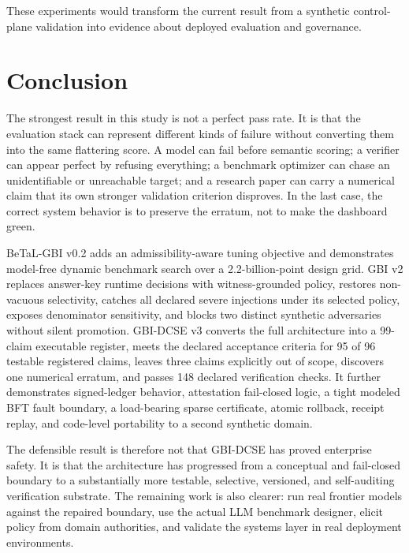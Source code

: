 \documentclass[11pt]{article}
\begin{document}
These experiments would transform the current result from a synthetic control-plane validation into evidence about deployed evaluation and governance.

\section{Conclusion}

The strongest result in this study is not a perfect pass rate. It is that the evaluation stack can represent different kinds of failure without converting them into the same flattering score. A model can fail before semantic scoring; a verifier can appear perfect by refusing everything; a benchmark optimizer can chase an unidentifiable or unreachable target; and a research paper can carry a numerical claim that its own stronger validation criterion disproves. In the last case, the correct system behavior is to preserve the erratum, not to make the dashboard green.

BeTaL-GBI v0.2 adds an admissibility-aware tuning objective and demonstrates model-free dynamic benchmark search over a 2.2-billion-point design grid. GBI v2 replaces answer-key runtime decisions with witness-grounded policy, restores non-vacuous selectivity, catches all declared severe injections under its selected policy, exposes denominator sensitivity, and blocks two distinct synthetic adversaries without silent promotion. GBI-DCSE v3 converts the full architecture into a 99-claim executable register, meets the declared acceptance criteria for 95 of 96 testable registered claims, leaves three claims explicitly out of scope, discovers one numerical erratum, and passes 148 declared verification checks. It further demonstrates signed-ledger behavior, attestation fail-closed logic, a tight modeled BFT fault boundary, a load-bearing sparse certificate, atomic rollback, receipt replay, and code-level portability to a second synthetic domain.

The defensible result is therefore not that GBI-DCSE has proved enterprise safety. It is that the architecture has progressed from a conceptual and fail-closed boundary to a substantially more testable, selective, versioned, and self-auditing verification substrate. The remaining work is also clearer: run real frontier models against the repaired boundary, use the actual LLM benchmark designer, elicit policy from domain authorities, and validate the systems layer in real deployment environments.

\appendix
\end{document}
